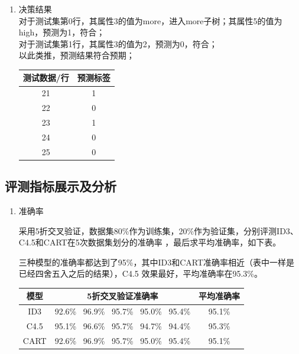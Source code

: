 \documentclass[UTF8,a4paper,12pt]{article}
\begin{document}
\begin{enumerate}[itemindent=0.5em,label=\arabic*、]
  \item 决策结果\\
  对于测试集第0行，其属性3的值为more，进入more子树；其属性5的值为high，预测为1，符合；\\
  对于测试集第1行，其属性3的值为2，预测为0，符合；\\
  以此类推，预测结果符合预期；
  \begin{center}
    \begin{tabular}{cc}
    \hline
    测试数据/行 & 预测标签\\
    \hline
    21 & 1\\
    22 & 0\\
    23 & 1\\
    24 & 0\\
    25 & 0\\
    \hline
    \end{tabular}
  \end{center}
\end{enumerate}

\subsection{评测指标展示及分析}
\begin{enumerate}[itemindent=0.5em,label=\arabic*、]
  \item 准确率
  \par \qquad 采用5折交叉验证，数据集80\%作为训练集，20\%作为验证集，分别评测ID3、C4.5和CART在5次数据集划分的准确率
  ，最后求平均准确率，如下表。
  \par \qquad 三种模型的准确率都达到了95\%，其中ID3和CART准确率相近（表中一样是已经四舍五入之后的结果），C4.5
  效果最好，平均准确率在95.3\%。
  \begin{center}
    \begin{tabular}{c|c|c}
    \hline
    模型 & 5折交叉验证准确率 & 平均准确率\\
    \hline
    ID3 & 92.6\% \vline \ 96.9\% \vline \ 95.7\% \vline \ 95.0\% \vline \ 95.4\% & 95.1\%\\
    \hline
    C4.5 & 95.1\% \vline \ 96.6\% \vline \ 95.7\% \vline \ 94.7\% \vline \ 94.4\% & 95.3\%\\
    \hline
    CART & 92.6\% \vline \ 96.9\%  \vline \ 95.7\%  \vline \ 95.0\%  \vline \ 95.4\% & 95.1\%\\
    \hline
    \end{tabular}
  \end{center}
\end{enumerate}
\end{document}
